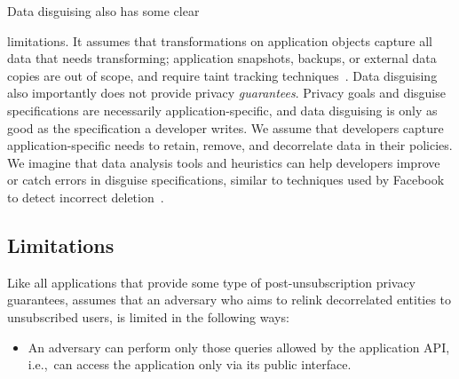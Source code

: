 Data disguising also has some clear {limitations.
It assumes that transformations on application objects capture all data that needs transforming;
application snapshots, backups, or external data copies are out of scope, and require
\eg taint tracking techniques~\cite{schengendb}.
Data disguising also importantly does not provide privacy \emph{guarantees}.
%
Privacy goals and disguise specifications are necessarily application-specific, and 
data disguising is only as good as the specification a developer writes. We assume
that developers capture application-specific needs to retain, remove, and decorrelate data in
their policies.
We imagine that data analysis tools and heuristics can help developers improve or catch
errors in disguise specifications, similar to techniques used by Facebook to detect incorrect
deletion~\cite{delf}.
%
%




\iffalse
\subsection{Limitations}
%
%
%
Like all applications that provide some type of post-unsubscription privacy guarantees, \name assumes
that an adversary who aims to relink decorrelated entities to unsubscribed users, is limited in the
following ways:
\begin{itemize}
    \item An adversary can perform only those queries allowed by the application API,
i.e.,\ can access the application only via its public interface.


\end{itemize}}
